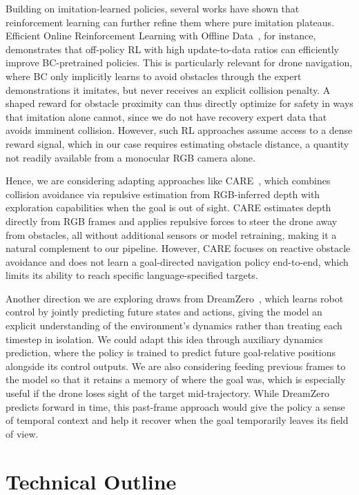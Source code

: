 \documentclass{article}
\begin{document}
Building on imitation-learned policies, several works have shown that reinforcement learning can further refine them where pure imitation plateaus. Efficient Online Reinforcement Learning with Offline Data~\citep{ball2023rlpd}, for instance, demonstrates that off-policy RL with high update-to-data ratios can efficiently improve BC-pretrained policies. This is particularly relevant for drone navigation, where BC only implicitly learns to avoid obstacles through the expert demonstrations it imitates, but never receives an explicit collision penalty. A shaped reward for obstacle proximity can thus directly optimize for safety in ways that imitation alone cannot, since we do not have recovery expert data that avoids imminent collision. However, such RL approaches assume access to a dense reward signal, which in our case requires estimating obstacle distance, a quantity not readily available from a monocular RGB camera alone.

Hence, we are considering adapting approaches like CARE~\citep{care2025}, which combines collision avoidance via repulsive estimation from RGB-inferred depth with exploration capabilities when the goal is out of sight. CARE estimates depth directly from RGB frames and applies repulsive forces to steer the drone away from obstacles, all without additional sensors or model retraining, making it a natural complement to our pipeline. However, CARE focuses on reactive obstacle avoidance and does not learn a goal-directed navigation policy end-to-end, which limits its ability to reach specific language-specified targets.

Another direction we are exploring draws from DreamZero~\citep{dreamzero2026}, which learns robot control by jointly predicting future states and actions, giving the model an explicit understanding of the environment's dynamics rather than treating each timestep in isolation. We could adapt this idea through auxiliary dynamics prediction, where the policy is trained to predict future goal-relative positions alongside its control outputs. We are also considering feeding previous frames to the model so that it retains a memory of where the goal was, which is especially useful if the drone loses sight of the target mid-trajectory. While DreamZero predicts forward in time, this past-frame approach would give the policy a sense of temporal context and help it recover when the goal temporarily leaves its field of view.

\section{Technical Outline} %
\end{document}
